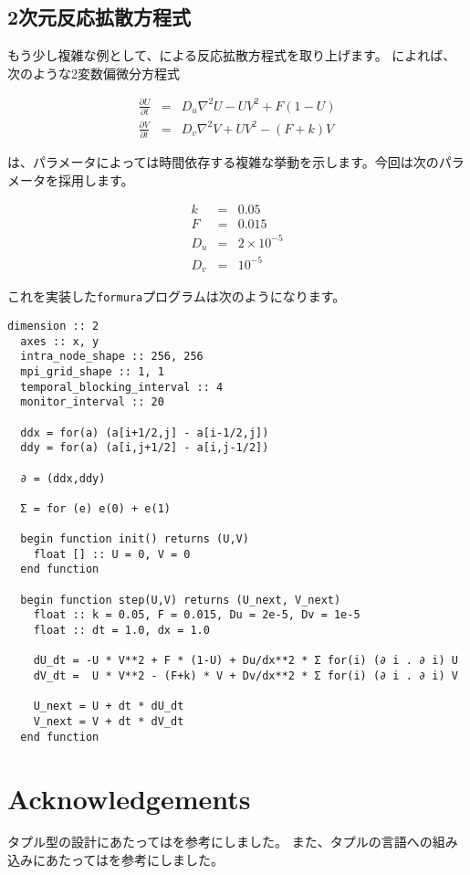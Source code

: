 \documentclass{jsarticle}
\newcommand{\formura}{{\texttt{formura}}}
\begin{document}
\subsection{2次元反応拡散方程式}

もう少し複雑な例として、\citet{pearson1993complex}による反応拡散方程式を取り上げます。
\citet{pearson1993complex}によれば、次のような2変数偏微分方程式

\begin{eqnarray}
  \frac{\partial U}{\partial t} &=& D_u \nabla^2 U - UV^2 + F(1-U)\\
  \frac{\partial V}{\partial t} &=& D_v \nabla^2 V + UV^2 - (F+k)V
\end{eqnarray}

は、パラメータによっては時間依存する複雑な挙動を示します。今回は次のパラメータを採用します。

\begin{eqnarray}
  k &=& 0.05\\
  F &=& 0.015\\
  D_u &=& 2 \times 10^{-5}\\
  D_v &=& 10^{-5}
\end{eqnarray}

これを実装した\formura プログラムは次のようになります。

\begin{lstlisting}[mathescape]
  dimension :: 2
  axes :: x, y
  intra_node_shape :: 256, 256
  mpi_grid_shape :: 1, 1
  temporal_blocking_interval :: 4
  monitor_interval :: 20

  ddx = for(a) (a[i+1/2,j] - a[i-1/2,j])
  ddy = for(a) (a[i,j+1/2] - a[i,j-1/2])

  ∂ = (ddx,ddy)

  Σ = for (e) e(0) + e(1)

  begin function init() returns (U,V)
    float [] :: U = 0, V = 0
  end function

  begin function step(U,V) returns (U_next, V_next)
    float :: k = 0.05, F = 0.015, Du = 2e-5, Dv = 1e-5
    float :: dt = 1.0, dx = 1.0

    dU_dt = -U * V**2 + F * (1-U) + Du/dx**2 * Σ for(i) (∂ i . ∂ i) U
    dV_dt =  U * V**2 - (F+k) * V + Dv/dx**2 * Σ for(i) (∂ i . ∂ i) V

    U_next = U + dt * dU_dt
    V_next = V + dt * dV_dt
  end function
\end{lstlisting}

\newpage

\section*{Acknowledgements}

タプル型の設計にあたっては\citet{pierce2002types}を参考にしました。
また、タプルの言語への組み込みにあたっては\citet{oliveira2015modular}を参考にしました。





\end{document}
